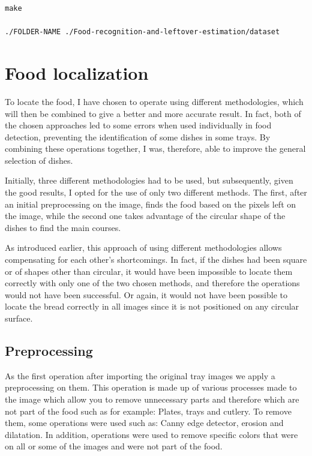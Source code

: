 \documentclass[
	a4paper, %
	10pt, %
	unnumberedsections, %
	twoside, %
]{LTJournalArticle}
\begin{document}
\begin{lstlisting}[breaklines=true]
make

./FOLDER-NAME ./Food-recognition-and-leftover-estimation/dataset
\end{lstlisting}


\section{Food localization}

To locate the food, I have chosen to operate using different methodologies, which will then be combined to give a better and more accurate result. In fact, both of the chosen approaches led to some errors when used individually in food detection, preventing the identification of some dishes in some trays. By combining these operations together, I was, therefore, able to improve the general selection of dishes.

Initially, three different methodologies had to be used, but subsequently, given the good results, I opted for the use of only two different methods. The first, after an initial preprocessing on the image, finds the food based on the pixels left on the image, while the second one takes advantage of the circular shape of the dishes to find the main courses.

As introduced earlier, this approach of using different methodologies allows compensating for each other's shortcomings. In fact, if the dishes had been square or of shapes other than circular, it would have been impossible to locate them correctly with only one of the two chosen methods, and therefore the operations would not have been successful. Or again, it would not have been possible to locate the bread correctly in all images since it is not positioned on any circular surface.

\subsection{Preprocessing}
As the first operation after importing the original tray images we apply a preprocessing on them.
This operation is made up of various processes made to the image which allow you to remove unnecessary parts and therefore which are not part of the food such as for example: Plates, trays and cutlery.
To remove them, some operations were used such as: Canny edge detector, erosion and dilatation. In addition, operations were used to remove specific colors that were on all or some of the images and were not part of the food.
\end{document}
